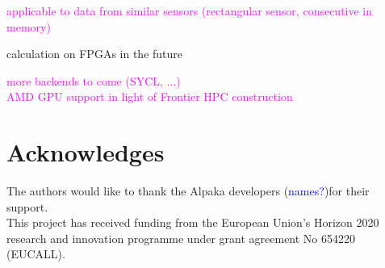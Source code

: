 \documentclass[a4paper]{article}
\begin{document}
\textcolor{magenta}{
applicable to data from similar sensors (rectangular sensor, consecutive in memory)
}

calculation on FPGAs in the future

\textcolor{magenta}{
more backends to come (SYCL, ...) \\
AMD GPU support in light of Frontier HPC construction
}

\section{Acknowledges}
The authors would like to thank the Alpaka developers (\textcolor{blue}{names?})for their support.\\

This project has received funding from the European Union's Horizon 2020 research and innovation programme under grant agreement No 654220 (EUCALL).

\newpage

\begin{sloppypar}
\printbibliography
\end{sloppypar}
\end{document}

